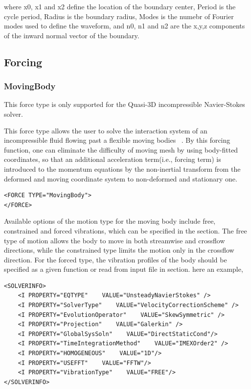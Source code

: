 where x0, x1 and x2 define the location of the boundary center, Period is the cycle period, Radius is the boundary radius, Modes is the numebr of Fourier modes used to define the waveform, and n0, n1 and n2 are the x,y,z components of the inward normal vector of the boundary.  

\subsection{Forcing}
\subsubsection{MovingBody}

\begin{notebox}
This force type is only supported for the Quasi-3D incompressible Navier-Stokes solver.
\end{notebox}

This force type allows the user to solve the interaction system of an incompressible fluid flowing past a flexible moving bodies ~\cite{NeKa97}. By this forcing function, one can eliminate the difficulty of moving mesh by using body-fitted coordinates, so that an additional acceleration term(i.e., forcing term) is introduced to the momentum equations by the non-inertial transform from the deformed and moving coordinate system to non-deformed and stationary one.

\begin{lstlisting}[style=XMLStyle]
<FORCE TYPE="MovingBody">
</FORCE>
\end{lstlisting}

Available options of the motion type for the moving body include free, constrained and forced vibrations, which can be specified in the  section. The free type of motion allows the body to move in both streamwise and crossflow directions, while the constrained type limits the motion only in the crossflow direction. For the forced type, the vibration profiles of the body should be specified as a given function or read from input file in  section. here an example,

\begin{lstlisting}[style=XMLStyle]
<SOLVERINFO>
    <I PROPERTY="EQTYPE"    VALUE="UnsteadyNavierStokes" />
    <I PROPERTY="SolverType"    VALUE="VelocityCorrectionScheme" />
    <I PROPERTY="EvolutionOperator"    VALUE="SkewSymmetric" />
    <I PROPERTY="Projection"    VALUE="Galerkin" />
    <I PROPERTY="GlobalSysSoln"    VALUE="DirectStaticCond"/>
    <I PROPERTY="TimeIntegrationMethod"    VALUE="IMEXOrder2" />
    <I PROPERTY="HOMOGENEOUS"    VALUE="1D"/>
    <I PROPERTY="USEFFT"    VALUE="FFTW"/>
    <I PROPERTY="VibrationType"    VALUE="FREE"/>
</SOLVERINFO>
\end{lstlisting}

